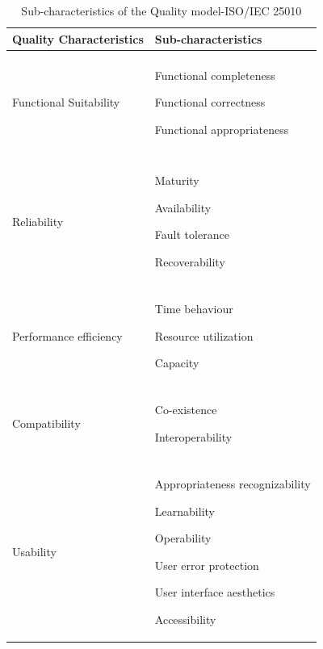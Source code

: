 \begin{table}[h!]
    \caption{Sub-characteristics of the Quality model-ISO/IEC 25010}
	\begin{tabularx}{\textwidth}{X | X }
	    \textbf{Quality Characteristics} & \textbf{Sub-characteristics}	
	    \\ \hline
		\\ %
		Functional Suitability
       
        & Functional completeness
        
        Functional correctness
        
        Functional appropriateness		
        
        \\ %
		\\ \hline
	     \\ %
		Reliability    
        
        &  Maturity 
        
        Availability
        
        Fault tolerance
        
        Recoverability
        
		\\ \hline
	     \\ %
	    Performance efficiency       
        
        & Time behaviour
        
        Resource utilization
        
        Capacity
        
        
	    \\ \hline
	  \\ %
	   Compatibility  
       
       &  Co-existence
       
       Interoperability   
       
     
	    \\ \hline
	    \\ %
	    
	   Usability	
       
       & Appropriateness recognizability
       
       Learnability
       
       Operability
       
       User error protection
       
       User interface aesthetics

       Accessibility
       

\end{tabularx}
\end{table}
